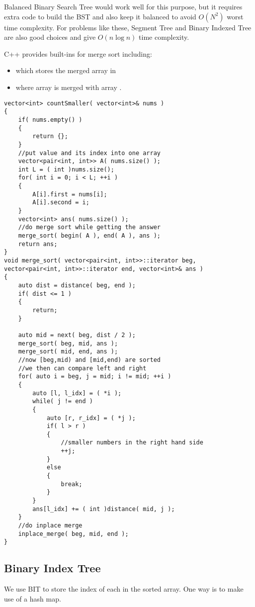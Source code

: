 Balanced Binary Search Tree would work well for this purpose, but it requires extra code to build the BST and also keep it balanced to avoid $O(N^2)$ worst time complexity. For problems like these, Segment Tree and Binary Indexed Tree are also good choices and give $O(n \log n)$ time complexity.

C++ provides built-ins for merge sort including:

\begin{itemize}
\item {} which stores the merged array in 
\item {} where array \fcj{[begin, middle)} is merged with array \fcj{[middle, end)}.
\end{itemize}


\begin{lstlisting}[style=customc, caption={Merge Sort}]
vector<int> countSmaller( vector<int>& nums )
{
    if( nums.empty() )
    {
        return {};
    }
    //put value and its index into one array
    vector<pair<int, int>> A( nums.size() );
    int L = ( int )nums.size();
    for( int i = 0; i < L; ++i )
    {
        A[i].first = nums[i];
        A[i].second = i;
    }
    vector<int> ans( nums.size() );
    //do merge sort while getting the answer
    merge_sort( begin( A ), end( A ), ans );
    return ans;
}
void merge_sort( vector<pair<int, int>>::iterator beg, vector<pair<int, int>>::iterator end, vector<int>& ans )
{
    auto dist = distance( beg, end );
    if( dist <= 1 )
    {
        return;
    }

    auto mid = next( beg, dist / 2 );
    merge_sort( beg, mid, ans );
    merge_sort( mid, end, ans );
    //now [beg,mid) and [mid,end) are sorted
    //we then can compare left and right
    for( auto i = beg, j = mid; i != mid; ++i )
    {
        auto [l, l_idx] = ( *i );
        while( j != end )
        {
            auto [r, r_idx] = ( *j );
            if( l > r )
            {
                //smaller numbers in the right hand side
                ++j;
            }
            else
            {
                break;
            }
        }
        ans[l_idx] += ( int )distance( mid, j );
    }
    //do inplace merge
    inplace_merge( beg, mid, end );
}
\end{lstlisting}

\subsection{Binary Index Tree}
We use BIT to store the index of each  in the sorted array. One way is to make use of a hash map.


